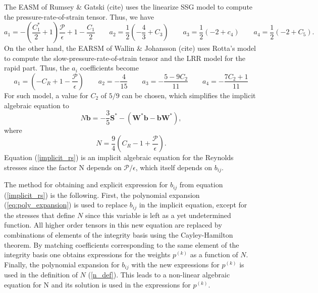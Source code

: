 \documentclass[oneside,a4paper,11pt]{report}
\newcommand{\Stau}{S^*}
\newcommand{\Wtau}{W^*}
\begin{document}
The EASM of Rumsey \& Gatski (cite) uses the linearize SSG model to compute the pressure-rate-of-strain tensor. Thus, we have
\begin{equation}
a_1 = - \left ( \frac{C_1^*}{2} + 1\right ) \frac{\mathcal{P}}{\epsilon} + 1 - \frac{C_1}{2} \qquad a_2 = \frac{1}{2} \left (-\frac{4}{3} + C_3 \right ) \qquad a_3 = \frac{1}{2} \left (-2 + c_4 \right ) \qquad a_4 = \frac{1}{2} \left (-2 + C_5 \right ).
\end{equation}
On the other hand, the EARSM of Wallin \& Johansson (cite) uses Rotta's model to compute the slow-pressure-rate-of-strain tensor and the LRR model for the rapid part.  Thus, the $a_i$ coefficients become
\begin{equation}
a_1 = \left ( -C_R + 1 - \frac{\mathcal{P}}{\epsilon} \right ) \qquad a_2 = -\frac{4}{15} \qquad a_3 = -\frac{5 - 9 C_2}{11} \qquad a_4 = -\frac{7C_2 + 1}{11}
\end{equation}
For such model, a value for $C_2$ of $5/9$ can be chosen, which simplifies the implicit algebraic equation to
\begin{equation}
\label{implicit_rs}
N \mathbf{b} = -\frac{3}{5} \mathbf{\Stau} - (\mathbf{\Wtau} \mathbf{b} - \mathbf{b} \mathbf{\Wtau}),
\end{equation}
where 
\begin{equation}
\label{n_def}
N = \frac{9}{4} \left ( C_R - 1 + \frac{\mathcal{P}}{\epsilon} \right ).
\end{equation}
Equation (\ref{implicit_rs}) is an implicit algebraic equation for the Reynolds stresses since the factor N depends on $\mathcal{P}/\epsilon$, which itself depends on $b_{ij}$. 

The method for obtaining and explicit expression for $b_{ij}$ from equation (\ref{implicit_rs}) is the following. First, the polynomial expansion (\ref{eq:poly_expansion}) is used to replace $b_{ij}$ in the implicit equation, except for the stresses that define $N$ since this variable is left as a yet undetermined function. All higher order tensors in this new equation are replaced by combinations of elements of the integrity basis using the Cayley-Hamilton theorem. By matching coefficients corresponding to the same element of the integrity basis one obtains expressions for the weights $p^{(k)}$ as a function of $N$. Finally, the polynomial expansion for $b_{ij}$ with the new  expressions for $p^{(k)}$ is used in the definition of $N$ (\ref{n_def}). This leads to a non-linear algebraic equation for N and its solution is used in the expressions for $p^{(k)}$.
\end{document}
